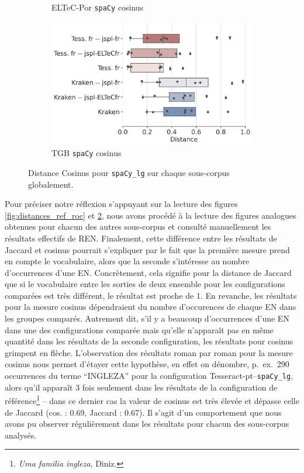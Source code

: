 \begin{figure}[h!]
\begin{subfigure}{0.5\textwidth}
        \caption{ELTeC-Por \texttt{spaCy} cosinus} 
         \label{fig:ELTeC-Por-spaCy-cosinus}
   \end{subfigure}
     \begin{subfigure}{0.5\textwidth}
  \includegraphics[height=.65\textwidth]{IMAGES/Boite-moustache/TGB_spaCy3.5.1_cosinus.png} 
        \caption{TGB \texttt{spaCy} cosinus}
   \end{subfigure}
    \caption{Distance Cosinus pour \texttt{spaCy\_lg} sur chaque sous-corpus globalement.}
\label{fig:Cosinus-spacy-lg}
\end{figure}


Pour préciser notre réflexion s'appuyant sur la lecture des figures \ref{fig:distances_ref_roc} et \ref{fig:Cosinus-spacy-lg},
nous avons procédé à la lecture des figures analogues obtenues pour chacun des autres sous-corpus et consulté manuellement les résultats effectifs de REN. Finalement, cette différence entre les résultats de Jaccard et cosinus pourrait s'expliquer par le fait que la première mesure prend en compte le vocabulaire, alors que la seconde s'intéresse au nombre d'occurrences d'une EN. Concrètement, cela signifie pour la distance de Jaccard que si le vocabulaire entre les sorties de deux ensemble pour les configurations comparées est très différent, le résultat est proche de 1. 
En revanche, les résultats pour la mesure cosinus dépendraient du nombre d'occurences de chaque EN dans les groupes comparés. Autrement dit, s'il y a beaucoup d'occurrences d'une EN dans une des configurations comparée mais qu'elle n'apparaît pas en même quantité dans les résultats de la seconde configuration, les résultats pour cosinus grimpent en flèche. L'observation des résultats roman par roman pour la mesure cosinus nous permet d'étayer cette hypothèse, en effet on dénombre, p.\ ex.\, 290 occurrences du terme ``INGLEZA'' pour la configuration Tesseract-pt--\texttt{spaCy\_lg}, alors qu'il apparaît 3 fois seulement dans les résultats de la configuration de référence\footnote{\textit{Uma familia ingleza}, Diniz.} -- dans ce dernier cas la valeur de cosinus est très élevée et dépasse celle de Jaccard (cos. : 0.69, Jaccard : 0.67). Il s'agit d'un comportement que nous avons pu observer régulièrement dans les résultats pour chacun des sous-corpus analysés.

